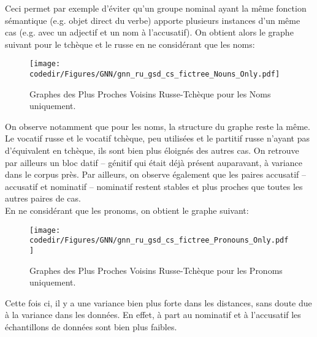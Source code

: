 \documentclass{cours}
\newcommand{\codedir}{Morphosyntactic-Categories_Code}
\begin{document}
    Ceci permet par exemple d'éviter qu'un groupe nominal ayant la même fonction sémantique (e.g. objet direct du verbe) apporte plusieurs instances d'un même cas (e.g. avec un adjectif et un nom à l'accusatif).
    On obtient alors le graphe suivant pour le tchèque et le russe en ne considérant que les noms:
    \begin{figure}[H]
	    \centering
	    \texttt{[image: \\codedir/Figures/GNN/gnn\_ru\_gsd\_cs\_fictree\_Nouns\_Only.pdf]}
	    \caption{Graphes des Plus Proches Voisins Russe-Tchèque pour les Noms uniquement.}
    \end{figure}
    On observe notamment que pour les noms, la structure du graphe reste la même.
    Le vocatif russe et le vocatif tchèque, peu utilisées et le partitif russe n'ayant pas d'équivalent en tchèque, ils sont bien plus éloignés des autres cas.
    On retrouve par ailleurs un bloc datif -- génitif qui était déjà présent auparavant, à variance dans le corpus près.
    Par ailleurs, on observe également que les paires accusatif -- accusatif et nominatif -- nominatif restent stables et plus proches que toutes les autres paires de cas.\\
    En ne considérant que les pronoms, on obtient le graphe suivant:
    \begin{figure}[H]
	    \centering
	    \texttt{[image: \\codedir/Figures/GNN/gnn\_ru\_gsd\_cs\_fictree\_Pronouns\_Only.pdf]}
	    \caption{Graphes des Plus Proches Voisins Russe-Tchèque pour les Pronoms uniquement.}
    \end{figure}
    Cette fois ci, il y a une variance bien plus forte dans les distances, sans doute due à la variance dans les données. En effet, à part au nominatif et à l'accusatif les échantillons de données sont bien plus faibles.
\end{document}
